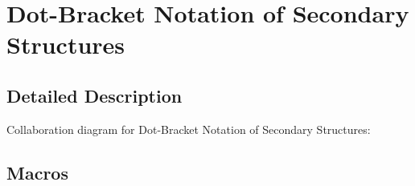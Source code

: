 \hypertarget{group__struct__utils__dot__bracket}{}\section{Dot-\/\+Bracket Notation of Secondary Structures}
\label{group__struct__utils__dot__bracket}


\subsection{Detailed Description}
Collaboration diagram for Dot-\/\+Bracket Notation of Secondary Structures\+:
\subsection*{Macros}
